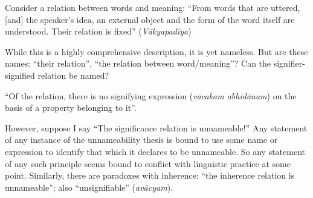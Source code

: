 Consider a relation between words and meaning: “From words that are uttered, [and] the speaker's idea, an external object and the form of the word itself are understood. Their relation is fixed” (\textsl{Vākyapadīya}) 

While this is a highly comprehensive description, it is yet nameless. But are these names: “their relation”, “the relation between word/meaning”? Can the signifier-signified relation be named? 

“Of the relation, there is no signifying expression (\textsl{vācakam abhidānam}) on the basis of a property belonging to it”. 

However, suppose I say “The significance relation is unnameable!” Any statement of any instance of the unnameability thesis is bound to use some name or expression to identify that which it declares to be unnameable. So any statement of any such principle seems bound to conflict with linguistic practice at some point. Similarly, there are paradoxes with inherence: “the inherence relation is unnameable”; also “unsignifiable” (\textsl{avācyam}).

